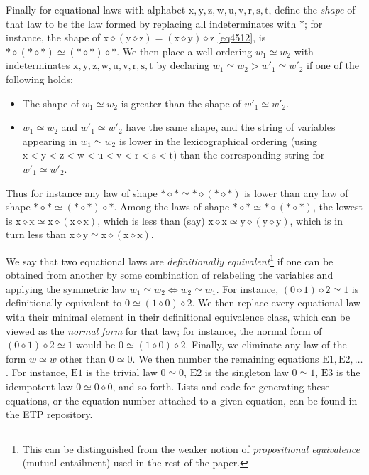 \documentclass[12pt]{amsart}
\theoremstyle{definition}
\newcommand{\x}{\mathrm{x}}
\newcommand{\y}{\mathrm{y}}
\newcommand{\z}{\mathrm{z}}
\newcommand{\w}{\mathrm{w}}
\newcommand{\uu}{\mathrm{u}}
\newcommand{\vv}{\mathrm{v}}
\newcommand{\op}{\diamond}
\newcommand{\formaleq}{\simeq}
\newcommand{\Eq}[1]{\mathrm{E}#1}
\begin{document}
Finally for equational laws with alphabet $\x,\y,\z,\w,\uu,\vv,\mathrm{r},\mathrm{s},\mathrm{t}$, define the \emph{shape} of that law to be the law formed by replacing all indeterminates with $\ast$; for instance, the shape of $\x \op (\y \op \z) = (\x \op \y) \op \z$ \eqref{eq4512}, is $\ast \op (\ast \op \ast) \formaleq (\ast \op \ast) \op \ast$.  We then place a well-ordering $w_1 \formaleq w_2$ with indeterminates $\x,\y,\z,\w,\uu,\vv,\mathrm{r},\mathrm{s},\mathrm{t}$ by declaring $w_1 \formaleq w_2 > w'_1 \formaleq w'_2$ if one of the following holds:
\begin{itemize}
\item The shape of $w_1 \formaleq w_2$ is greater than the shape of $w'_1 \formaleq w'_2$.
\item $w_1 \formaleq w_2$ and $w'_1 \formaleq w'_2$ have the same shape, and the string of variables appearing in $w_1 \formaleq w_2$ is lower in the lexicographical ordering (using $\x < \y < \z < \w < \uu < \vv < \mathrm{r} < \mathrm{s} < \mathrm{t}$) than the corresponding string for $w'_1 \formaleq w'_2$.
\end{itemize}
Thus for instance any law of shape $\ast \op \ast \formaleq \ast \op (\ast \op \ast)$ is lower than any law of shape
$\ast \op \ast \formaleq (\ast \op \ast) \op \ast$.  Among the laws of shape $\ast \op \ast \formaleq \ast \op (\ast \op \ast)$, the lowest is $\x \op \x \formaleq \x \op (\x \op \x)$, which is less than (say) $\x \op \x \formaleq \y \op (\y \op \y)$, which is in turn less than $\x \op \y \formaleq \x \op (\x \op \x)$.

We say that two equational laws are \emph{definitionally equivalent}\footnote{This can be distinguished from the weaker notion of \emph{propositional equivalence} (mutual entailment) used in the rest of the paper.} if one can be obtained from another by some combination of relabeling the variables and applying the symmetric law $w_1 \formaleq w_2 \iff w_2 \formaleq w_1$.  For instance, $(0 \op 1) \op 2 \formaleq 1$ is definitionally equivalent to $0 \formaleq (1 \op 0) \op 2$.  We then replace every equational law with their minimal element in their definitional equivalence class, which can be viewed as the \emph{normal form} for that law; for instance, the normal form of $(0 \op 1) \op 2 \formaleq 1$ would be $0 \formaleq (1 \op 0) \op 2$.  Finally, we eliminate any law of the form $w \formaleq w$ other than $0 \formaleq 0$.  We then number the remaining equations $\Eq{1}, \Eq{2}, \dots$.  For instance, $\Eq{1}$ is the trivial law $0 \formaleq 0$, $\Eq{2}$ is the singleton law $0 \formaleq 1$, $\Eq{3}$ is the idempotent law $0 \formaleq 0 \op 0$, and so forth.  Lists and code for generating these equations, or the equation number attached to a given equation, can be found in the ETP repository.
\end{document}
